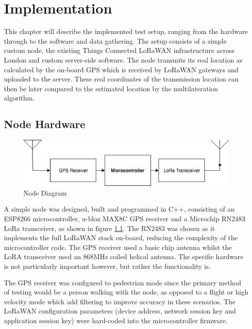 \documentclass[a4paper]{report}
\begin{document}
\chapter{Implementation}

  This chapter will describe the implemented test setup, ranging from the hardware through to the software and data gathering. The setup consists of a simple custom node, the existing Things Connected LoRaWAN infrastructure across London and custom server-side software. The node transmits its real location as calculated by the on-board GPS which is received by LoRaWAN gateways and uploaded to the server. These real coordinates of the transmission location can then be later compared to the estimated location by the multilateration algorithm.


  \section{Node Hardware}

    \begin{figure}
    \centering
    \includegraphics[width=12cm]{figures/node.jpeg}
    \caption{Node Diagram}
    \label{fig:node}
    \end{figure}

    A simple node was designed, built and programmed in C++, consisting of an ESP8266 microcontroller, u-blox MAX8C GPS receiver and a Microchip RN2483 LoRa transceiver, as shown in figure \ref{fig:node}. The RN2483 was chosen as it implements the full LoRaWAN stack on-board, reducing the complexity of the microcontroller code. The GPS receiver used a basic chip antenna whilst the LoRA transceiver used an 868MHz coiled helical antenna. The specific hardware is not particularly important however, but rather the functionality is.

    The GPS receiver was configured to pedestrian mode since the primary method of testing would be a person walking with the node, as opposed to a flight or high velocity mode which add filtering to improve accuracy in these scenarios. The LoRaWAN configuration parameters (device address, network session key and application session key) were hard-coded into the microcontroller firmware.
\end{document}
